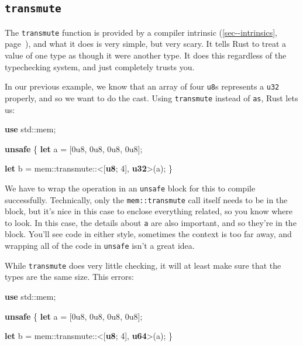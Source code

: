 \documentclass[a4paper,]{book}
\renewcommand*{\hyperref}[2][\ar]{%
  \def\ar{#2}%
  #2 (\autoref{#1}, page~\pageref{#1})}
\newenvironment{Shaded}{\begin{snugshade}}{\end{snugshade}}
\newcommand{\KeywordTok}[1]{\textcolor[rgb]{0.13,0.29,0.53}{\textbf{{#1}}}}
\newcommand{\DecValTok}[1]{\textcolor[rgb]{0.00,0.00,0.81}{{#1}}}
\newcommand{\NormalTok}[1]{{#1}}
\begin{document}
\subsection{\texorpdfstring{\texttt{transmute}}{transmute}}\label{transmute}

The \texttt{transmute} function is provided by a
\hyperref[sec--intrinsics]{compiler intrinsic}, and what it does is very
simple, but very scary. It tells Rust to treat a value of one type as
though it were another type. It does this regardless of the typechecking
system, and just completely trusts you.

In our previous example, we know that an array of four \texttt{u8}s
represents a \texttt{u32} properly, and so we want to do the cast. Using
\texttt{transmute} instead of \texttt{as}, Rust lets us:

\begin{Shaded}
\begin{Highlighting}[]
\KeywordTok{use} \NormalTok{std::mem;}

\KeywordTok{unsafe} \NormalTok{\{}
    \KeywordTok{let} \NormalTok{a = [}\DecValTok{0u8}\NormalTok{, }\DecValTok{0u8}\NormalTok{, }\DecValTok{0u8}\NormalTok{, }\DecValTok{0u8}\NormalTok{];}

    \KeywordTok{let} \NormalTok{b = mem::transmute::<[}\KeywordTok{u8}\NormalTok{; }\DecValTok{4}\NormalTok{], }\KeywordTok{u32}\NormalTok{>(a);}
\NormalTok{\}}
\end{Highlighting}
\end{Shaded}

We have to wrap the operation in an \texttt{unsafe} block for this to
compile successfully. Technically, only the \texttt{mem::transmute} call
itself needs to be in the block, but it's nice in this case to enclose
everything related, so you know where to look. In this case, the details
about \texttt{a} are also important, and so they're in the block. You'll
see code in either style, sometimes the context is too far away, and
wrapping all of the code in \texttt{unsafe} isn't a great idea.

While \texttt{transmute} does very little checking, it will at least
make sure that the types are the same size. This errors:

\begin{Shaded}
\begin{Highlighting}[]
\KeywordTok{use} \NormalTok{std::mem;}

\KeywordTok{unsafe} \NormalTok{\{}
    \KeywordTok{let} \NormalTok{a = [}\DecValTok{0u8}\NormalTok{, }\DecValTok{0u8}\NormalTok{, }\DecValTok{0u8}\NormalTok{, }\DecValTok{0u8}\NormalTok{];}

    \KeywordTok{let} \NormalTok{b = mem::transmute::<[}\KeywordTok{u8}\NormalTok{; }\DecValTok{4}\NormalTok{], }\KeywordTok{u64}\NormalTok{>(a);}
\NormalTok{\}}
\end{Highlighting}
\end{Shaded}
\end{document}
